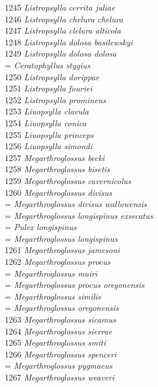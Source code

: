 \documentclass[
]{article}
\begin{document}
1245 \emph{Listropsylla cerrita juliae}\\
1246 \emph{Listropsylla chelura chelura}\\
1247 \emph{Listropsylla clelura alticola}\\
1248 \emph{Listropsylla dolosa basilewskyi}\\
1249 \emph{Listropsylla dolosa dolosa}\\
= \emph{Ceratophyllus stygius}\\
1250 \emph{Listropsylla dorippae}\\
1251 \emph{Listropsylla fouriei}\\
1252 \emph{Listropsylla prominens}\\
1253 \emph{Liuopsylla clavula}\\
1254 \emph{Liuopsylla conica}\\
1255 \emph{Liuopsylla princeps}\\
1256 \emph{Liuopsylla simondi}\\
1257 \emph{Megarthroglossus becki}\\
1258 \emph{Megarthroglossus bisetis}\\
1259 \emph{Megarthroglossus cavernicolus}\\
1260 \emph{Megarthroglossus divisus}\\
= \emph{Megarthroglossus divisus wallowensis}\\
= \emph{Megarthroglossus longispinus exsecatus}\\
= \emph{Pulex longispinus}\\
= \emph{Megarthroglossus longispinus}\\
1261 \emph{Megarthroglossus jamesoni}\\
1262 \emph{Megarthroglossus procus}\\
= \emph{Megarthroglossus muiri}\\
= \emph{Megarthroglossus procus oregonensis}\\
= \emph{Megarthroglossus similis}\\
= \emph{Megarthroglossus oregonensis}\\
1263 \emph{Megarthroglossus sicamus}\\
1264 \emph{Megarthroglossus sierrae}\\
1265 \emph{Megarthroglossus smiti}\\
1266 \emph{Megarthroglossus spenceri}\\
= \emph{Megarthroglossus pygmaeus}\\
1267 \emph{Megarthroglossus weaveri}\\
\end{document}
